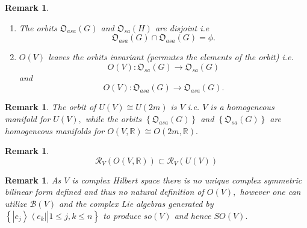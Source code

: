 \documentclass[aps,preprint]{revtex4}%
\newtheorem{remark}[theorem]{Remark}
\begin{document}
\begin{remark}
\begin{enumerate}
\item The orbits $\mathfrak{O}_{asa}\left(  G\right)  $ and $\mathfrak{O}%
_{sa}\left(  H\right)  $ are disjoint i.e
\begin{equation}
\mathfrak{O}_{asa}\left(  G\right)  \cap\mathfrak{O}_{asa}\left(  G\right)
=\phi.
\end{equation}


\item $O\left(  V\right)  $ leaves the orbits invariant (permutes the elements
of the orbit) i.e.
\begin{equation}
O\left(  V\right)  :\mathfrak{O}_{sa}\left(  G\right)  \rightarrow
\mathfrak{O}_{sa}\left(  G\right)
\end{equation}
and
\begin{equation}
O\left(  V\right)  :\mathfrak{O}_{asa}\left(  G\right)  \rightarrow
\mathfrak{O}_{asa}\left(  G\right)  .
\end{equation}

\end{enumerate}
\end{remark}

\begin{remark}
The orbit of $U\left(  V\right)  \cong U\left(  2m\right)  $ is $V$ i.e. $V$
is a homogeneous manifold for $U\left(  V\right)  ,$ while the orbits
$\left\{  \mathfrak{O}_{asa}\left(  G\right)  \right\}  $ and $\left\{
\mathfrak{O}_{sa}\left(  G\right)  \right\}  $ are homogeneous manifolds for
$O\left(  V,\mathbb{R}\right)  \cong O\left(  2m,\mathbb{R}\right)  .$
\end{remark}

\begin{remark}%
\begin{equation}
\mathcal{R}_{V}\left(  O\left(  V,\mathbb{R}\right)  \right)  \subset
\mathcal{R}_{V}\left(  U\left(  V\right)  \right)
\end{equation}

\end{remark}

\begin{remark}
As $V$ is complex Hilbert space there is no unique complex symmetric bilinear
form defined and thus no natural definition of $O\left(  V\right)  ,$ however
one can utilize $\mathcal{B}\left(  V\right)  $ and the complex Lie algebras
generated by $\left\{  \left.  \left\vert e_{j}\right\rangle \left\langle
e_{k}\right\vert \right\vert 1\leq j,k\leq n\right\}  $ to produce $so\left(
V\right)  $ and hence $SO\left(  V\right)  .$
\end{remark}
\end{document}
